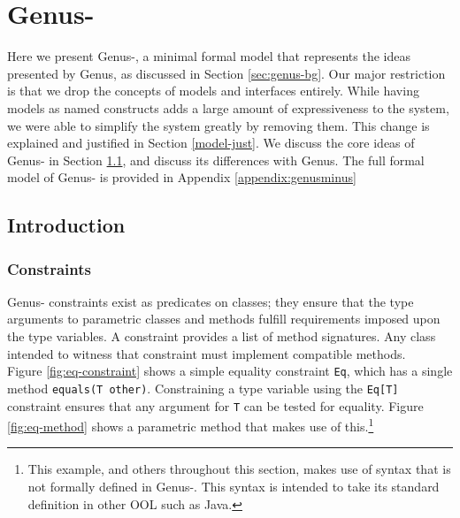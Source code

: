 \chapter{Genus-} \label{chpt:genus-}

Here we present Genus-, a minimal formal model that represents the ideas presented by Genus\cite{Zhang2015}, as discussed in Section \ref{sec:genus-bg}. Our major restriction is that we drop the concepts of models and interfaces entirely. While having models as named constructs adds a large amount of expressiveness to the system, we were able to simplify the system greatly by removing them. This change is explained and justified in Section \ref{model-just}. We discuss the core ideas of Genus- in Section \ref{G-Concepts}, and discuss its differences with Genus. The full formal model of Genus- is provided in Appendix \ref{appendix:genusminus}

\section{Introduction} \label{G-Concepts}

\subsection{Constraints} \label{sec:genus-constraints}

Genus- constraints exist as predicates on classes; they ensure that the type arguments to parametric classes and methods fulfill requirements imposed upon the type variables. A constraint provides a list of method signatures. Any class intended to witness that constraint must implement compatible methods. \\

Figure \ref{fig:eq-constraint} shows a simple equality constraint \texttt{Eq}, which has a single method \texttt{equals(T other)}. Constraining a type variable using the \texttt{Eq[T]} constraint ensures that any argument for \texttt{T} can be tested for equality. Figure \ref{fig:eq-method} shows a parametric method that makes use of this.\footnote{This example, and others throughout this section, makes use of syntax that is not formally defined in Genus-. This syntax is intended to take its standard definition in other OOL such as Java.} \\

